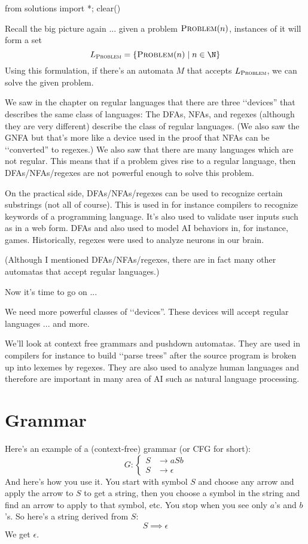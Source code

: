 \begin{python0}
from solutions import *; clear()
\end{python0}

Recall the big picture again ... given a problem 
$\text{\textsc{Problem}}(n)$, instances of it
will form a set 
\[
L_{\text{\textsc{Problem}}} = 
\{ 
\text{\textsc{Problem}}(n) \mid n \in \N
\}
\]
Using this formulation, if there's an automata $M$ that accepts
$L_{\text{\textsc{Problem}}}$, we can solve the given problem.

We saw in the chapter on regular languages that
there are three \lq\lq devices'' that describes the
same class of languages:
The DFAs, NFAs, and regexes (although they are very different) describe
the class of regular languages.
(We also saw the GNFA but that's more like a device used in the proof
that NFAs can be \lq\lq converted'' to regexes.)
We also saw that there are many languages which are not regular.
This means that if a problem gives rise to a regular language, then
DFAs/NFAs/regexes are not powerful enough to solve this problem.

On the practical side, DFAs/NFAs/regexes can be used to 
recognize certain substrings (not all of course).
This is used in for instance compilers to recognize keywords of a 
programming language.
It's also used to validate user inputs such as in a web form.
DFAs and also used to model AI behaviors in, for instance, games.
Historically, regexes were used to analyze neurons in our brain.

(Although I mentioned DFAs/NFAs/regexes, there are in fact many 
other automatas that accept regular languages.)

Now it's time to go on ...

We need more powerful classes of \lq\lq devices''.
These devices will accept regular languages ... and more.

We'll look at context free grammars and pushdown automatas.
They are used in compilers for instance to build \lq\lq parse trees''
after the source program is broken up into lexemes by regexes.
They are also used to analyze human languages and therefore are
important in many area of AI such as natural language processing.

\newpage
\section{Grammar}

Here's an example of a (context-free) grammar (or CFG for short):
\[
G :
\begin{cases}
S &\rightarrow aSb \\
S &\rightarrow \epsilon
\end{cases}
\]
And here's how you use it.
You start with symbol $S$ and choose any arrow and apply the arrow to $S$
to get a string, then you choose a symbol in the string and find an arrow to
apply to that symbol, etc.
You stop when you see only $a$'s and $b$'s.
So here's a string derived from $S$:
\[
S \implies \epsilon
\]
We get $\epsilon$.

